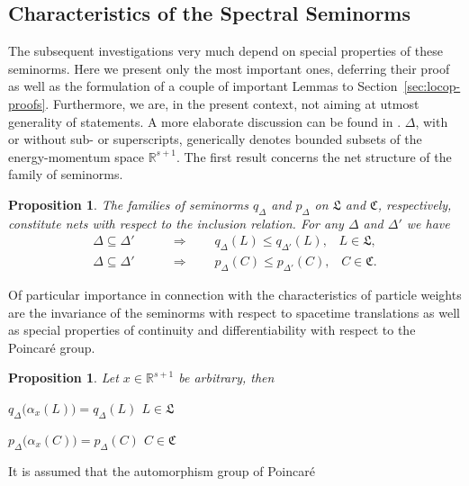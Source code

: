 \documentclass[a4paper,a4paper]{article}
\numberwithin{equation}{section}
\newcommand{\Cfrak}{\mathfrak{C}}
\newcommand{\Lfrak}{\mathfrak{L}}
\newcommand{\Rsone}{\mathbb{R}^{s + 1}}
\newcommand{\ax}{\alpha_x}
\newcounter{propitem}
\newenvironment{proplist}{\begin{list}{(\roman{propitem})}%
  {\usecounter{propitem} \setlength{\topsep}{0ex}%
   \setlength{\parsep}{0.2ex} \setlength{\itemsep}{0.4ex}%
   \setlength{\leftmargin}{0em} \setlength{\itemindent}{0.5em}%
   }}{\end{list}}
\theoremstyle{definition}
\theoremstyle{plain}
\newtheorem{proposition}[definition]{Proposition}
\theoremstyle{remark}
\newcommand{\pD}{p_\Delta}
\newcommand{\pDx}[1]{p_\Delta ( #1 )}
\newcommand{\bpDx}[1]{p_\Delta \bigl( #1 \bigr)}
\newcommand{\pDprimex}[1]{p_{\Delta'} ( #1 )}
\newcommand{\qD}{q_\Delta}
\newcommand{\qDx}[1]{q_\Delta ( #1 )}
\newcommand{\bqDx}[1]{q_\Delta \bigl( #1 \bigr)}
\newcommand{\qDprimex}[1]{q_{\Delta'} ( #1 )}
\begin{document}
\subsection{Characteristics of the Spectral Seminorms}
  
  The subsequent investigations very much depend on special properties
  of these seminorms. Here we present only the most important ones,
  deferring their proof as well as the formulation of a couple of
  important Lemmas to Section~\ref{sec:locop-proofs}. Furthermore, we
  are, in the present context, not aiming at utmost generality of
  statements. A more elaborate discussion can be found in
  \cite{porrmann:2000}. $\Delta$, with or without sub- or
  superscripts, generically denotes bounded subsets of the
  energy-momentum space $\Rsone$. The first result concerns the net
  structure of the family of seminorms.
  \begin{proposition}
    \label{pro:seminorm-nets}
    The families of seminorms $\qD$ and $\pD$ on $\Lfrak$ and
    $\Cfrak$, respectively, constitute nets with respect to the
    inclusion relation. For any $\Delta$ and $\Delta'$ we have
    \begin{align*}
      \Delta \subseteq \Delta' \qquad & \Rightarrow \qquad \qDx{L}
      \leqslant \qDprimex{L} \text{,} \quad L \in \Lfrak \text{,} \\
      \Delta \subseteq \Delta' \qquad & \Rightarrow \qquad \pDx{C}
      \leqslant \pDprimex{C} \text{,} \quad C \in \Cfrak \text{.}
    \end{align*}
  \end{proposition}
  Of particular importance in connection with the characteristics of
  particle weights are the invariance of the seminorms with respect to
  spacetime translations as well as special properties of continuity
  and differentiability with respect to the Poincar\'e group.
  \begin{proposition}
    \label{pro:seminorm-translation-invariance}
    Let $x \in \Rsone$ be arbitrary, then
    \begin{proplist}
    \item \hfill $\bqDx{\ax ( L )} = \qDx{L}$ \text{,} \quad $L \in
      \Lfrak$ \text{;}
      \hfill \text{~}
    \item \hfill $\bpDx{\ax ( C )} = \pDx{C}$ \text{,} \quad $C \in
      \Cfrak$  \hfill \text{~}
    \end{proplist}
  \end{proposition}
  It is assumed that the automorphism group of Poincar\'e
\end{document}
